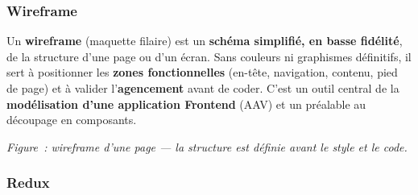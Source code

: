 \subsubsection*{Wireframe}
{}

\noindent Un \textbf{wireframe} (\og{}maquette filaire\fg{}) est un \textbf{schéma simplifié, en basse fidélité}, de la structure d'une page ou d'un écran. Sans couleurs ni graphismes définitifs, il sert à positionner les \textbf{zones fonctionnelles} (en-tête, navigation, contenu, pied de page) et à valider l'\textbf{agencement} avant de coder. C'est un outil central de la \textbf{modélisation d'une application Frontend} (AAV) et un préalable au découpage en composants.
\vspace{0.2cm}
\begin{center}
\end{center}
\noindent\textit{Figure~: wireframe d'une page — la structure est définie avant le style et le code.}

\subsubsection*{Redux}
{}

